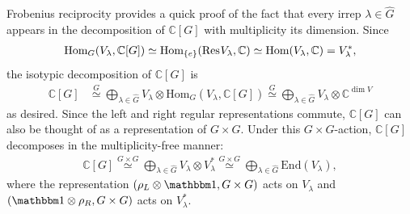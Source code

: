 Frobenius reciprocity provides a quick proof of the fact that every irrep $\lambda \in \hat{G}$ appears in the decomposition of $\mathbb{C}[G]$ with multiplicity its dimension. Since
\begin{align}
\text{Hom}_G (V_{\lambda}, \mathbb{C}[G]) \simeq \text{Hom}_{\{e\}} (\text{Res}^{}_{} {V_{\lambda}}, \mathbb{C}) \simeq \text{Hom} (V_{\lambda},\mathbb{C}) = V_{\lambda}^*,
\end{align}
the isotypic decomposition of $\mathbb{C}[G]$ is
\begin{align}
\mathbb{C}[G] &\stackrel{G}{\simeq} \bigoplus_{\lambda \in \hat{G}} V_{\lambda} \otimes \text{Hom}_G (V_{\lambda},\mathbb{C}[G])
\stackrel{G}{\simeq} \bigoplus_{\lambda \in \hat{G}} V_{\lambda} \otimes \mathbb{C}^{\dim V}
\end{align}
as desired. Since the left and right regular representations commute, $\mathbb{C}[G]$ can also be thought of as a representation of $G \times G$. Under this $G \times G$-action, $\mathbb{C}[G]$ decomposes in the multiplicity-free manner:
\begin{align}\label{Regular decomposition}
\mathbb{C}[G] \stackrel{G \times G}{\simeq} \bigoplus_{\lambda \in \hat{G}} V_{\lambda} \otimes V_{\lambda}^*
\stackrel{G \times G}{\simeq} \bigoplus_{\lambda \in \hat{G}} \text{End}(V_{\lambda}),
\end{align}
where the representation $(\rep_L \otimes \id, G\times G)$ acts on $V_{\lambda}$ and $(\id \otimes \rep_R, G\times G)$ acts on $V_{\lambda}^*$.

